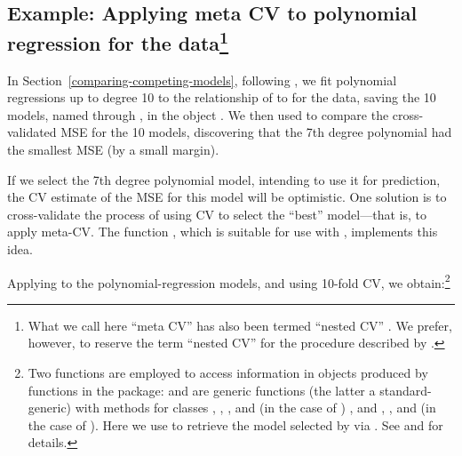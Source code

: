 \documentclass[
]{jss}
\begin{document}
\subsection[Example: Applying meta CV to polynomial regression for the
Auto data]{\texorpdfstring{Example: Applying meta CV to polynomial
regression for the 
data\footnote{What we call here ``meta CV'' has also been termed
  ``nested CV'' \citep[e.g., in the  package
  by][]{OlsenZachariae:2024}. We prefer, however, to reserve the term
  ``nested CV'' for the procedure described by
  \citet{BatesHastieTibshirani:2023}.}}{Example: Applying meta CV to polynomial regression for the Auto data}}\label{example-applying-meta-cv-to-polynomial-regression-for-the-auto-datameta-cv}

In Section~\ref{comparing-competing-models}, following \citet[Secs. 5.1,
5.3]{JamesEtAl:2021}, we fit polynomial regressions up to degree 10 to
the relationship of  to  for the 
data, saving the 10 models, named  through , in the
object . We then used  to compare the
cross-validated MSE for the 10 models, discovering that the 7th degree
polynomial had the smallest MSE (by a small margin).

If we select the 7th degree polynomial model, intending to use it for
prediction, the CV estimate of the MSE for this model will be
optimistic. One solution is to cross-validate the process of using CV to
select the ``best'' model---that is, to apply meta-CV. The function
, which is suitable for use with ,
implements this idea.

Applying  to the 
polynomial-regression models, and using 10-fold CV, we
obtain:\footnote{Two functions are employed to access information in
  objects produced by functions in the  package: 
  and  are generic functions (the latter a
  standard- generic) with methods for classes ,
  , , and  (in the
  case of ) , and , , and
   (in the case of ). Here we
  use  to retrieve the model
  selected by  via . See 
  and  for details.}
\end{document}
